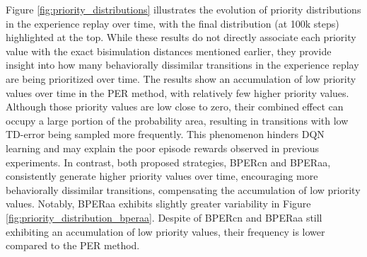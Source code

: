 Figure \ref{fig:priority_distributions} illustrates the evolution of priority distributions in the experience replay over time, with the final distribution (at 100k steps) highlighted at the top. While these results do not directly associate each priority value with the exact bisimulation distances mentioned earlier, they provide insight into how many behaviorally dissimilar transitions in the experience replay are being prioritized over time. The results show an accumulation of low priority values over time in the PER method, with relatively few higher priority values. Although those priority values are low close to zero, their combined effect can occupy a large portion of the probability area, resulting in transitions with low TD-error being sampled more frequently. This phenomenon hinders DQN learning and may explain the poor episode rewards observed in previous experiments. In contrast, both proposed strategies, BPERcn and BPERaa, consistently generate higher priority values over time, encouraging more behaviorally dissimilar transitions, compensating the accumulation of low priority values. Notably, BPERaa exhibits slightly greater variability in Figure \ref{fig:priority_distribution_bperaa}. Despite of BPERcn and BPERaa still exhibiting an accumulation of low priority values, their frequency is lower compared to the PER method. 




